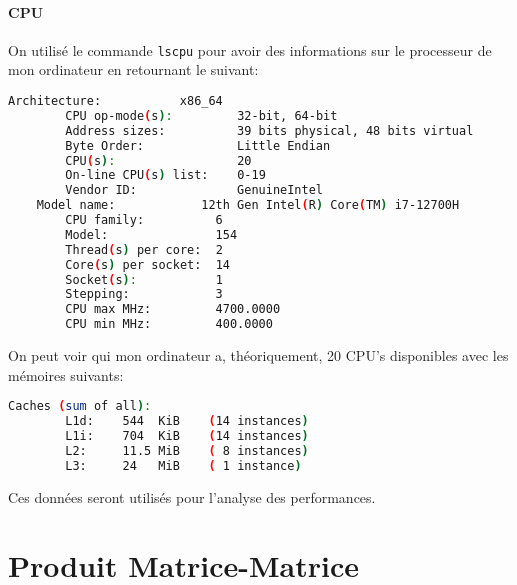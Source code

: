 \documentclass{article}
\begin{document}
\paragraph{CPU}On utilisé le commande \texttt{lscpu} pour avoir des informations sur le processeur de mon ordinateur en retournant le suivant:
\begin{scriptsize}
    \mycode
    \begin{lstlisting}[language=bash]
    Architecture:           x86_64
        CPU op-mode(s):         32-bit, 64-bit
        Address sizes:          39 bits physical, 48 bits virtual
        Byte Order:             Little Endian
        CPU(s):                 20
        On-line CPU(s) list:    0-19
        Vendor ID:              GenuineIntel
    Model name:            12th Gen Intel(R) Core(TM) i7-12700H
        CPU family:          6
        Model:               154
        Thread(s) per core:  2
        Core(s) per socket:  14
        Socket(s):           1
        Stepping:            3
        CPU max MHz:         4700.0000
        CPU min MHz:         400.0000
    \end{lstlisting}
\end{scriptsize}
On peut voir qui mon ordinateur a, théoriquement, 20 CPU's disponibles avec les mémoires suivants:
\begin{scriptsize}
    \mycode
    \begin{lstlisting}[language=bash]
    Caches (sum of all):     
        L1d:    544  KiB    (14 instances)
        L1i:    704  KiB    (14 instances)
        L2:     11.5 MiB    ( 8 instances)
        L3:     24   MiB    ( 1 instance)
    \end{lstlisting}
\end{scriptsize}
Ces données seront utilisés pour l'analyse des performances. 



\section{Produit Matrice-Matrice}
\end{document}
